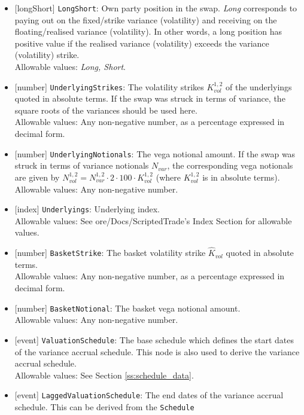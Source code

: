 \begin{itemize}
  \item{}[longShort] \lstinline!LongShort!: Own party position in the swap. \emph{Long} corresponds to paying out on the
  fixed/strike variance (volatility) and receiving on the floating/realised variance (volatility). In other words,
  a long position has positive value if the realised variance (volatility) exceeds the variance (volatility)
  strike. \\
  Allowable values: \emph{Long, Short}.
  \item{}[number] \lstinline!UnderlyingStrikes!: The volatility strikes $K^{1,2}_{vol}$ of the underlyings quoted in
  absolute terms. If the swap was struck in terms of variance, the square roots of the variances should be used here. \\
  Allowable values: Any non-negative number, as a percentage expressed in decimal form.
  \item{}[number] \lstinline!UnderlyingNotionals!: The vega notional amount. If the swap was struck in terms of variance notionals
  $N_{var}$, the corresponding vega notionals are given by $N^{1,2}_{vol} = N^{1,2}_{var} \cdot 2 \cdot 100 \cdot K^{1,2}_{vol}$
  (where $K^{1,2}_{vol}$ is in absolute terms). \\
  Allowable values: Any non-negative number.
  \item{}[index] \lstinline!Underlyings!: Underlying index. \\
  Allowable values: See ore/Docs/ScriptedTrade's Index Section for allowable values. 
  \item{}[number] \lstinline!BasketStrike!: The basket volatility strike $\hat{K}_{vol}$ quoted in absolute terms. \\
  Allowable values: Any non-negative number, as a percentage expressed in decimal form.
  \item{}[number] \lstinline!BasketNotional!: The basket vega notional amount. \\
  Allowable values: Any non-negative number.
  \item{}[event] \lstinline!ValuationSchedule!: The base schedule which defines the start dates of the variance accrual schedule. This node is
  also used to derive the variance accrual schedule. \\
  Allowable values: See Section \ref{ss:schedule_data}.
  \item{}[event] \lstinline!LaggedValuationSchedule!: The end dates of the variance accrual schedule. This can be derived from the \lstinline!Schedule!

\end{itemize}
